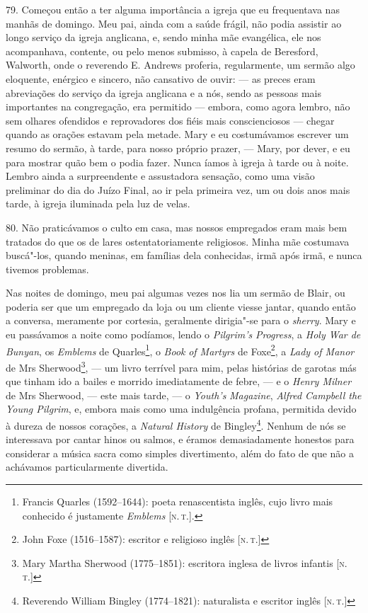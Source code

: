 79. Começou então a ter alguma importância a igreja que eu frequentava
nas manhãs de domingo. Meu pai, ainda com a saúde frágil, não podia
assistir ao longo serviço da igreja anglicana, e, sendo minha mãe
evangélica, ele nos acompanhava, contente, ou pelo menos submisso, à
capela de Beresford, Walworth, onde o reverendo E. Andrews proferia,
regularmente, um sermão algo eloquente, enérgico e sincero, não
cansativo de ouvir: --- as preces eram abreviações do serviço da igreja
anglicana e a nós, sendo as pessoas mais importantes na congregação, era
permitido --- embora, como agora lembro, não sem olhares ofendidos e
reprovadores dos fiéis mais conscienciosos --- chegar quando as orações
estavam pela metade. Mary e eu costumávamos escrever um resumo do
sermão, à tarde, para nosso próprio prazer, --- Mary, por dever, e eu
para mostrar quão bem o podia fazer. Nunca íamos à igreja à tarde ou à
noite. Lembro ainda a surpreendente e assustadora sensação, como uma
visão preliminar do dia do Juízo Final, ao ir pela primeira vez, um ou
dois anos mais tarde, à igreja iluminada pela luz de velas.

80. Não praticávamos o culto em casa, mas nossos empregados eram mais
bem tratados do que os de lares ostentatoriamente religiosos. Minha mãe
costumava buscá"-los, quando meninas, em famílias dela conhecidas, irmã
após irmã, e nunca tivemos problemas.

Nas noites de domingo, meu pai algumas vezes nos lia um sermão de Blair,
ou poderia ser que um empregado da loja ou um cliente viesse jantar,
quando então a conversa, meramente por cortesia, geralmente dirigia"-se
para o \emph{sherry}. Mary e eu passávamos a noite como podíamos, lendo
o \emph{Pilgrim's} \emph{Progress}, a \emph{Holy War de Bunyan}, os
\emph{Emblems} de Quarles\footnote{Francis Quarles (1592--1644): poeta
  renascentista inglês, cujo livro mais conhecido é justamente
  \emph{Emblems} {[}\textsc{n.\,t.}{]}.}, o \emph{Book} \emph{of Martyrs} de
Foxe\footnote{John Foxe (1516--1587): escritor e religioso inglês {[}\textsc{n.\,t.}{]}}, a \emph{Lady of Manor} de Mrs Sherwood\footnote{Mary Martha
  Sherwood (1775--1851): escritora inglesa de livros infantis {[}\textsc{n.\,t.}{]}}, --- um livro terrível para mim, pelas histórias de garotas más
que tinham ido a bailes e morrido imediatamente de febre, --- e o
\emph{Henry Milner} de Mrs Sherwood, --- este mais tarde, --- o
\emph{Youth's} \emph{Magazine}, \emph{Alfred Campbell the Young
Pilgrim}, e, embora mais como uma indulgência profana, permitida devido
à dureza de nossos corações, a \emph{Natural History} de
Bingley\footnote{Reverendo William Bingley (1774--1821): naturalista e
  escritor inglês {[}\textsc{n.\,t.}{]}}. Nenhum de nós se interessava por
cantar hinos ou salmos, e éramos demasiadamente honestos para considerar
a música sacra como simples divertimento, além do fato de que não a
achávamos particularmente divertida.


